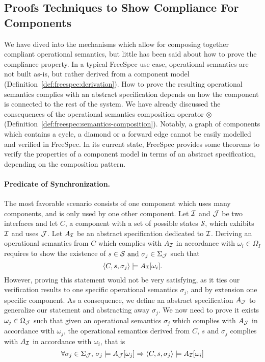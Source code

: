 \subsection{Proofs Techniques to Show Compliance For Components}

We have dived into the mechanisms which allow for composing together compliant
operational semantics, but little has been said about how to prove the
compliance property.
%
In a typical FreeSpec use case, operational semantics are not built as-is, but
rather derived from a component model
(Definition~\ref{def:freespec:derivation}).
%
How to prove the resulting operational semantics complies with an abstract
specification depends on how the component is connected to the rest of the
system.
%
We have already discussed the consequences of the operational semantics
composition operator $\otimes$
(Definition~\ref{def:freespec:semantics-composition}).
%
Notably, a graph of components which contains a cycle, a diamond or a forward
edge cannot be easily modelled and verified in FreeSpec.
%
In its current state, FreeSpec provides some theorems to verify the properties
of a component model in terms of an abstract specification, depending on the
composition pattern. 

\paragraph{Predicate of Synchronization.}
%
The most favorable scenario consists of one component which uses many
components, and is only used by one other component. 
%
Let $\mathcal{I}$ and $\mathcal{J}$ be two interfaces and let $C$, a component with a set of
possible states $\mathcal{S}$, which exhibits $\mathcal{I}$ and uses $\mathcal{J}$.
%
Let $A_{\mathcal{I}}$ be an abstract specification dedicated to $\mathcal{I}$.
%
Deriving an operational semantics from $C$ which complies with $A_{\mathcal{I}}$ in
accordance with $\omega_i \in \Omega_I$ requires to show the existence of
$s \in \mathcal{S} \text{ and }\sigma_j \in \Sigma_{\mathcal{J}}$ such that
\[ \langle C, s, \sigma_j \rangle \models A_{\mathcal{I}}[\omega_i]. \]
%
However, proving this statement would not be very satisfying, as it ties our
verification results to one specific operational semantics $\sigma_j$, and by
extension one specific component.
%
As a consequence, we define an abstract specification $A_{\mathcal{J}}$ to generalize our
statement and abstracting away $\sigma_j$.
%
We now need to prove it exists $\omega_j \in \Omega_{\mathcal{J}}$ such that given an
operational semantics $\sigma_j$ which complies with $A_{\mathcal{J}}$ in accordance with
$\omega_j$, the operational semantics derived from $C$, $s$ and $\sigma_j$
complies with $A_{\mathcal{I}}$ in accordance with $\omega_i$, that is
\[ \forall \sigma_j \in \Sigma_{\mathcal{J}}\text{, }\sigma_j \models A_{\mathcal{J}}[\omega_j]
  \Rightarrow \langle C, s, \sigma_j \rangle \models A_{\mathcal{I}}[\omega_i]
\]


